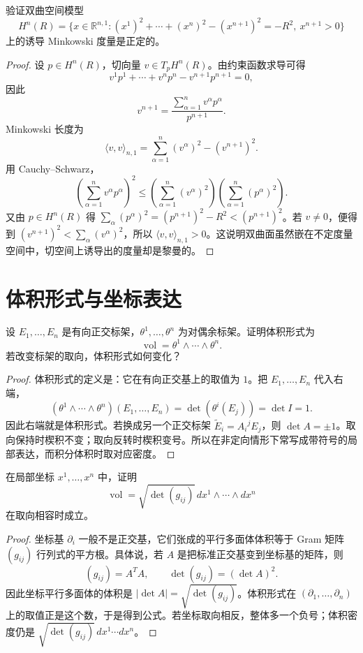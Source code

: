 \documentclass[11pt,a4paper,openany]{ctexbook}
\numberwithin{equation}{chapter}
\begin{document}
\begin{problem}
验证双曲空间模型
\[
H^n(R)=\{x\in \mathbb R^{n,1}: (x^1)^2+\cdots+(x^n)^2-(x^{n+1})^2=-R^2,\ x^{n+1}>0\}
\]
上的诱导 Minkowski 度量是正定的。
\end{problem}
\begin{proof}
设 \(p\in H^n(R)\)，切向量 \(v\in T_pH^n(R)\)。由约束函数求导可得
\[
v^1p^1+\cdots+v^np^n-v^{n+1}p^{n+1}=0,
\]
因此
\[
v^{n+1}=\frac{\sum_{\alpha=1}^n v^\alpha p^\alpha}{p^{n+1}}.
\]
Minkowski 长度为
\[
\langle v,v\rangle_{n,1}=\sum_{\alpha=1}^n (v^\alpha)^2-(v^{n+1})^2.
\]
用 Cauchy--Schwarz，
\[
\left(\sum_{\alpha=1}^n v^\alpha p^\alpha\right)^2
\le \left(\sum_{\alpha=1}^n (v^\alpha)^2\right)
\left(\sum_{\alpha=1}^n (p^\alpha)^2\right).
\]
又由 \(p\in H^n(R)\) 得 \(\sum_{\alpha}(p^\alpha)^2=(p^{n+1})^2-R^2<(p^{n+1})^2\)。若 \(v\ne0\)，便得到 \((v^{n+1})^2<\sum_\alpha(v^\alpha)^2\)，所以 \(\langle v,v\rangle_{n,1}>0\)。这说明双曲面虽然嵌在不定度量空间中，切空间上诱导出的度量却是黎曼的。
\end{proof}

\section{体积形式与坐标表达}

\begin{problem}
设 \(E_1,\ldots,E_n\) 是有向正交标架，\(\theta^1,\ldots,\theta^n\) 为对偶余标架。证明体积形式为
\[
\operatorname{vol}=\theta^1\wedge\cdots\wedge\theta^n.
\]
若改变标架的取向，体积形式如何变化？
\end{problem}
\begin{proof}
体积形式的定义是：它在有向正交基上的取值为 \(1\)。把 \(E_1,\ldots,E_n\) 代入右端，
\[
(\theta^1\wedge\cdots\wedge\theta^n)(E_1,\ldots,E_n)=\det(\theta^i(E_j))=\det I=1.
\]
因此右端就是体积形式。若换成另一个正交标架 \(\widetilde E_i=A_i{}^jE_j\)，则 \(\det A=\pm1\)。取向保持时楔积不变；取向反转时楔积变号。所以在非定向情形下常写成带符号的局部表达，而积分体积时取对应密度。
\end{proof}

\begin{problem}
在局部坐标 \(x^1,\ldots,x^n\) 中，证明
\[
\operatorname{vol}=\sqrt{\det(g_{ij})}\,dx^1\wedge\cdots\wedge dx^n
\]
在取向相容时成立。
\end{problem}
\begin{proof}
坐标基 \(\partial_i\) 一般不是正交基，它们张成的平行多面体体积等于 Gram 矩阵 \((g_{ij})\) 行列式的平方根。具体说，若 \(A\) 是把标准正交基变到坐标基的矩阵，则
\[
(g_{ij})=A^TA,\qquad \det(g_{ij})=(\det A)^2.
\]
因此坐标平行多面体的体积是 \(|\det A|=\sqrt{\det(g_{ij})}\)。体积形式在 \((\partial_1,\ldots,\partial_n)\) 上的取值正是这个数，于是得到公式。若坐标取向相反，整体多一个负号；体积密度仍是 \(\sqrt{\det(g_{ij})}\,dx^1\cdots dx^n\)。
\end{proof}
\end{document}
